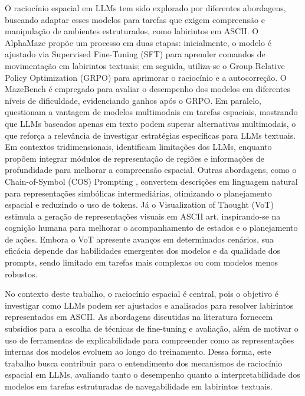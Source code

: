 O raciocínio espacial em LLMs tem sido explorado por diferentes abordagens, buscando adaptar esses modelos para tarefas que exigem compreensão e manipulação de ambientes estruturados, como labirintos em ASCII. O AlphaMaze \cite{dao2025alphamaze} propõe um processo em duas etapas: inicialmente, o modelo é ajustado via Supervised Fine-Tuning (SFT) para aprender comandos de movimentação em labirintos textuais; em seguida, utiliza-se o Group Relative Policy Optimization (GRPO) para aprimorar o raciocínio e a autocorreção. O MazeBench é empregado para avaliar o desempenho dos modelos em diferentes níveis de dificuldade, evidenciando ganhos após o GRPO. Em paralelo, \cite{jiang2024supervised} questionam a vantagem de modelos multimodais em tarefas espaciais, mostrando que LLMs baseados apenas em texto podem superar alternativas multimodais, o que reforça a relevância de investigar estratégias específicas para LLMs textuais. Em contextos tridimensionais, \cite{zhang2025point} identificam limitações dos LLMs, enquanto \cite{cheng2024spatialrgpt} propõem integrar módulos de representação de regiões e informações de profundidade para melhorar a compreensão espacial. Outras abordagens, como o Chain-of-Symbol (COS) Prompting \cite{hu2023chain}, convertem descrições em linguagem natural para representações simbólicas intermediárias, otimizando o planejamento espacial e reduzindo o uso de tokens. Já o Visualization of Thought (VoT) \cite{wu2024mind} estimula a geração de representações visuais em ASCII art, inspirando-se na cognição humana para melhorar o acompanhamento de estados e o planejamento de ações. Embora o VoT apresente avanços em determinados cenários, sua eficácia depende das habilidades emergentes dos modelos e da qualidade dos prompts, sendo limitado em tarefas mais complexas ou com modelos menos robustos.

No contexto deste trabalho, o raciocínio espacial é central, pois o objetivo é investigar como LLMs podem ser ajustados e analisados para resolver labirintos representados em ASCII. As abordagens discutidas na literatura fornecem subsídios para a escolha de técnicas de fine-tuning e avaliação, além de motivar o uso de ferramentas de explicabilidade para compreender como as representações internas dos modelos evoluem ao longo do treinamento. Dessa forma, este trabalho busca contribuir para o entendimento dos mecanismos de raciocínio espacial em LLMs, avaliando tanto o desempenho quanto a interpretabilidade dos modelos em tarefas estruturadas de navegabilidade em labirintos textuais.

